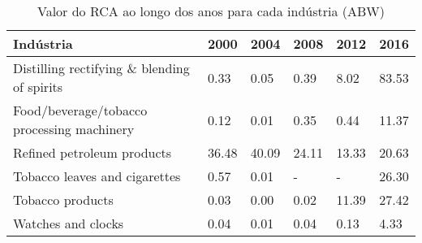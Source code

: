 \begin{table}
\centering
\caption{Valor do RCA ao longo dos anos para cada indústria (ABW)}
\label{tab:ex3-tempo-ABW}
\begin{tabular}{p{6cm}p{1.5cm}p{1.5cm}p{1.5cm}p{1.5cm}p{1.5cm}}
\toprule
                                  Indústria &  2000 &  2004 &  2008 &  2012 &  2016 \\
\midrule
Distilling rectifying \& blending of spirits &  0.33 &  0.05 &  0.39 &  8.02 & 83.53 \\
 Food/beverage/tobacco processing machinery &  0.12 &  0.01 &  0.35 &  0.44 & 11.37 \\
                 Refined petroleum products & 36.48 & 40.09 & 24.11 & 13.33 & 20.63 \\
              Tobacco leaves and cigarettes &  0.57 &  0.01 &     - &     - & 26.30 \\
                           Tobacco products &  0.03 &  0.00 &  0.02 & 11.39 & 27.42 \\
                         Watches and clocks &  0.04 &  0.01 &  0.04 &  0.13 &  4.33 \\
\bottomrule
\end{tabular}
\end{table}
